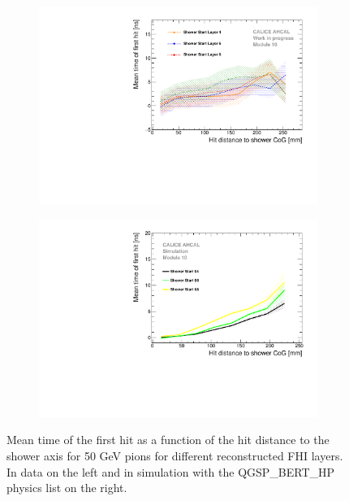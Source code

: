 \begin{figure}[htbp!]
	\begin{subfigure}[t]{0.5\textwidth}
		\centering
		\includegraphics[width=1\textwidth]{../Thesis_Plots/Timing/Pions/Plots/Timing_Radius_Comparison_ShortAsymRange_ShowerStart_FixedModule.pdf}
		\caption{}\label{fig:Radius_FHI_Fixed}
	\end{subfigure}
	\hfill
	\begin{subfigure}[t]{0.5\textwidth}
		\centering
		\includegraphics[width=1\textwidth]{../Thesis_Plots/Timing/Pions/Plots/Radius_ShowerStartTruth_FixedModule.pdf}
		\caption{}\label{fig:Radius_FHI_FixedSim}
	\end{subfigure}
	\caption{Mean time of the first hit as a function of the hit distance to the shower axis for 50 GeV pions for different reconstructed FHI layers. In data on the left and in simulation with the QGSP\_BERT\_HP physics list on the right.}
	\label{fig:Radius_FHISim}
\end{figure}


